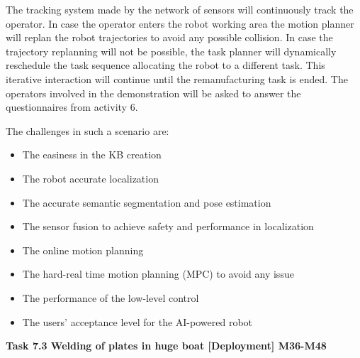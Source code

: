 \begin{planactivitybody}
The tracking system made by the network of sensors will continuously
track the operator. In case the operator enters the robot working area
the motion planner will replan the robot trajectories to avoid any
possible collision. In case the trajectory replanning will not be
possible, the task planner will dynamically reschedule the task sequence
allocating the robot to a different task. This iterative interaction
will continue until the remanufacturing task is ended. The operators
involved in the demonstration will be asked to answer the questionnaires
from activity 6.

The challenges in such a scenario are:

\begin{itemize}
\item
  The easiness in the KB creation
\item
  The robot accurate localization
\item
  The accurate semantic segmentation and pose estimation
\item
  The sensor fusion to achieve safety and performance in localization
\item
  The online motion planning
\item
  The hard-real time motion planning (MPC) to avoid any issue
\item
  The performance of the low-level control
\item
  The users' acceptance level for the AI-powered robot
\end{itemize}

\plantaskskip
\textbf{Task 7.3 Welding of plates in huge boat {[}Deployment{]}
M36-M48}


\end{planactivitybody}
